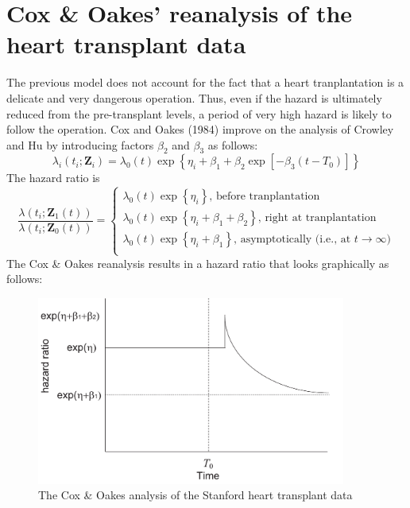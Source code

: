 \documentclass[10pt]{book}
\newcommand{\bfZ}{\mathbf{Z}}
\begin{document}
\section{Cox \& Oakes' reanalysis of the heart transplant data}
The previous model does not account for the fact that a heart tranplantation is a delicate and very dangerous operation.  Thus, even if the hazard is ultimately reduced from the pre-transplant levels, a period of very high hazard is likely to follow the operation.  Cox and Oakes (1984) improve on the analysis of Crowley and Hu by introducing factors $\beta_2$ and $\beta_3$ as follows:
$$
\lambda_i(t_i;\bfZ_i)=\lambda_0(t)\exp\left \{ \eta_i+\beta_1+\beta_2\exp[-\beta_3(t-T_0)]\right \}
$$
The hazard ratio is
$$
\frac{\lambda(t_i;\bfZ_1(t))}{\lambda(t_i;\bfZ_0(t))}=\left \{ \begin{array}{l}
   \lambda_0(t)\exp\left \{ \eta_i\right \}\mbox{, before tranplantation}\\
   \lambda_0(t)\exp\left \{ \eta_i+\beta_1+\beta_2 \right \}\mbox{, right at tranplantation}\\
   \lambda_0(t)\exp\left \{ \eta_i+\beta_1\right \}\mbox{, asymptotically (i.e., at $t\rightarrow\infty$})\\
\end{array}\right .
$$
The Cox \& Oakes reanalysis results in a hazard ratio that looks graphically as follows:
\begin{figure}[ht]
\centerline{\includegraphics[width=4in]{lect8_g3.pdf}}
\caption{The Cox \& Oakes analysis of the Stanford heart transplant data}
\end{figure}
\end{document}
